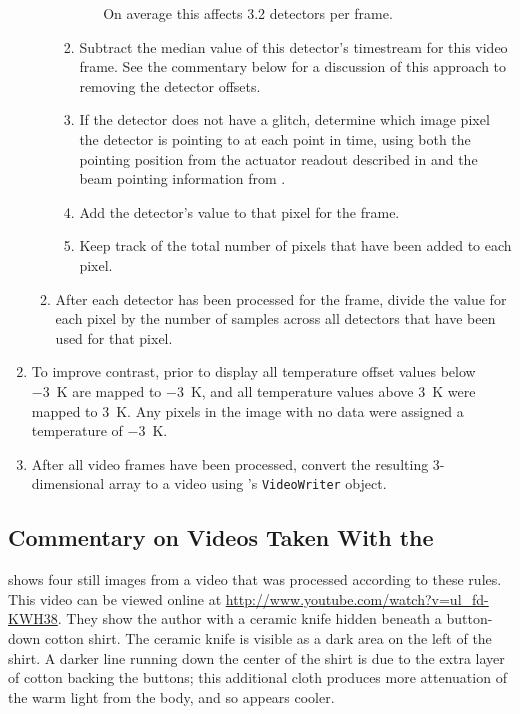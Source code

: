 \begin{enumerate}
\begin{enumerate}
\begin{enumerate}
\begin{enumerate}
            On average this affects 3.2 detectors per frame.
      \end{enumerate}
    \item Subtract the median value of this detector's timestream for this video frame.
          See the commentary below for a discussion of this approach to removing the detector offsets.
    \item If the detector does not have a glitch, determine which image pixel the detector is pointing to at each point in time, using both the pointing position from the actuator readout described in  and the beam pointing information from .
    \item Add the detector's value to that pixel for the frame.
    \item Keep track of the total number of pixels that have been added to each pixel.
    \end{enumerate}
  \item After each detector has been processed for the frame, divide the value for each pixel by the number of samples across all detectors that have been used for that pixel.
  \end{enumerate}
  \item To improve contrast, prior to display all temperature offset values below \SI{-3}{\K} are mapped to \SI{-3}{\K}, and all temperature values above \SI{3}{\K} were mapped to \SI{3}{\K}.
        Any pixels in the image with no data were assigned a temperature of \SI{-3}{\K}.
  \item After all video frames have been processed, convert the resulting 3-dimensional array to a video using \MATLAB's \texttt{VideoWriter} object.
\end{enumerate}

\subsection{Commentary on Videos Taken With the \Imager}

 shows four still images from a video that was processed according to these rules.
This video can be viewed online at \url{http://www.youtube.com/watch?v=ul_fd-KWH38}. %
They show the author with a ceramic knife hidden beneath a button-down cotton shirt.
The ceramic knife is visible as a dark area on the left of the shirt.
A darker line running down the center of the shirt is due to the extra layer of cotton backing the buttons; this additional cloth produces more attenuation of the warm light from the body, and so appears cooler.

